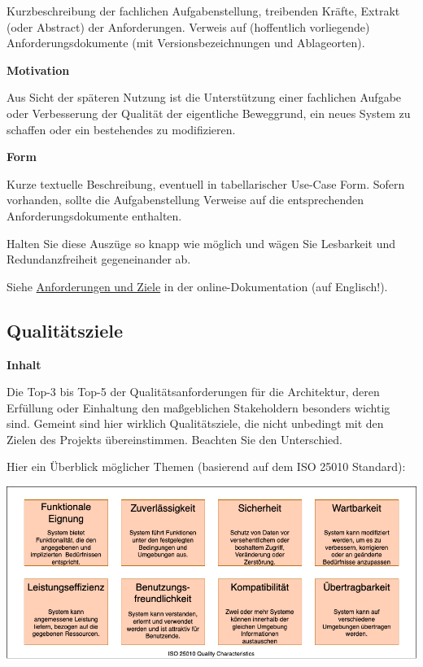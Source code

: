 \documentclass[
]{article}
\begin{document}
Kurzbeschreibung der fachlichen Aufgabenstellung, treibenden Kräfte,
Extrakt (oder Abstract) der Anforderungen. Verweis auf (hoffentlich
vorliegende) Anforderungsdokumente (mit Versionsbezeichnungen und
Ablageorten).

\textbf{Motivation}

Aus Sicht der späteren Nutzung ist die Unterstützung einer fachlichen
Aufgabe oder Verbesserung der Qualität der eigentliche Beweggrund, ein
neues System zu schaffen oder ein bestehendes zu modifizieren.

\textbf{Form}

Kurze textuelle Beschreibung, eventuell in tabellarischer Use-Case Form.
Sofern vorhanden, sollte die Aufgabenstellung Verweise auf die
entsprechenden Anforderungsdokumente enthalten.

Halten Sie diese Auszüge so knapp wie möglich und wägen Sie Lesbarkeit
und Redundanzfreiheit gegeneinander ab.

Siehe \href{https://docs.arc42.org/section-1/}{Anforderungen und Ziele}
in der online-Dokumentation (auf Englisch!).

\hypertarget{_qualit_tsziele}{%
\subsection{Qualitätsziele}\label{_qualit_tsziele}}

\textbf{Inhalt}

Die Top-3 bis Top-5 der Qualitätsanforderungen für die Architektur,
deren Erfüllung oder Einhaltung den maßgeblichen Stakeholdern besonders
wichtig sind. Gemeint sind hier wirklich Qualitätsziele, die nicht
unbedingt mit den Zielen des Projekts übereinstimmen. Beachten Sie den
Unterschied.

Hier ein Überblick möglicher Themen (basierend auf dem ISO 25010
Standard):

\includegraphics{images/01_2_iso-25010-topics-DE.drawio.png}
\end{document}
